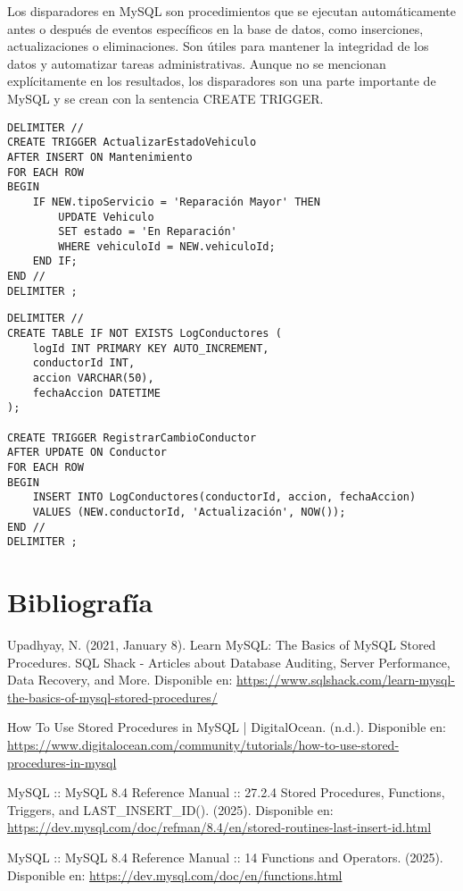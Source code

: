 \documentclass{article}
\begin{document}
\textnormal{Los disparadores en MySQL son procedimientos que se ejecutan automáticamente antes o después de eventos específicos en la base de datos, como inserciones, actualizaciones o eliminaciones. Son útiles para mantener la integridad de los datos y automatizar tareas administrativas. Aunque no se mencionan explícitamente en los resultados, los disparadores son una parte importante de MySQL y se crean con la sentencia CREATE TRIGGER.}

\begin{lstlisting}[style=sqlstyle]
    DELIMITER //
CREATE TRIGGER ActualizarEstadoVehiculo 
AFTER INSERT ON Mantenimiento
FOR EACH ROW
BEGIN
    IF NEW.tipoServicio = 'Reparación Mayor' THEN
        UPDATE Vehiculo 
        SET estado = 'En Reparación' 
        WHERE vehiculoId = NEW.vehiculoId;
    END IF;
END //
DELIMITER ;
\end{lstlisting}

\begin{lstlisting}[style=sqlstyle]
    DELIMITER //
CREATE TABLE IF NOT EXISTS LogConductores (
    logId INT PRIMARY KEY AUTO_INCREMENT,
    conductorId INT,
    accion VARCHAR(50),
    fechaAccion DATETIME
);

CREATE TRIGGER RegistrarCambioConductor
AFTER UPDATE ON Conductor
FOR EACH ROW
BEGIN
    INSERT INTO LogConductores(conductorId, accion, fechaAccion)
    VALUES (NEW.conductorId, 'Actualización', NOW());
END //
DELIMITER ;
\end{lstlisting}

\newpage

\section{Bibliografía}

\begin{thebibliography}{9}

 Upadhyay, N. (2021, January 8). Learn MySQL: The Basics of MySQL Stored Procedures. SQL Shack - Articles about Database Auditing, Server Performance, Data Recovery, and More. Disponible en: \url{https://www.sqlshack.com/learn-mysql-the-basics-of-mysql-stored-procedures/}

 How To Use Stored Procedures in MySQL | DigitalOcean. (n.d.). Disponible en: \url{https://www.digitalocean.com/community/tutorials/how-to-use-stored-procedures-in-mysql}

 MySQL :: MySQL 8.4 Reference Manual :: 27.2.4 Stored Procedures, Functions, Triggers, and LAST_INSERT_ID(). (2025). Disponible en: \url{https://dev.mysql.com/doc/refman/8.4/en/stored-routines-last-insert-id.html}

 MySQL :: MySQL 8.4 Reference Manual :: 14 Functions and Operators. (2025). Disponible en: \url{https://dev.mysql.com/doc/en/functions.html}

\end{thebibliography}
\end{document}
